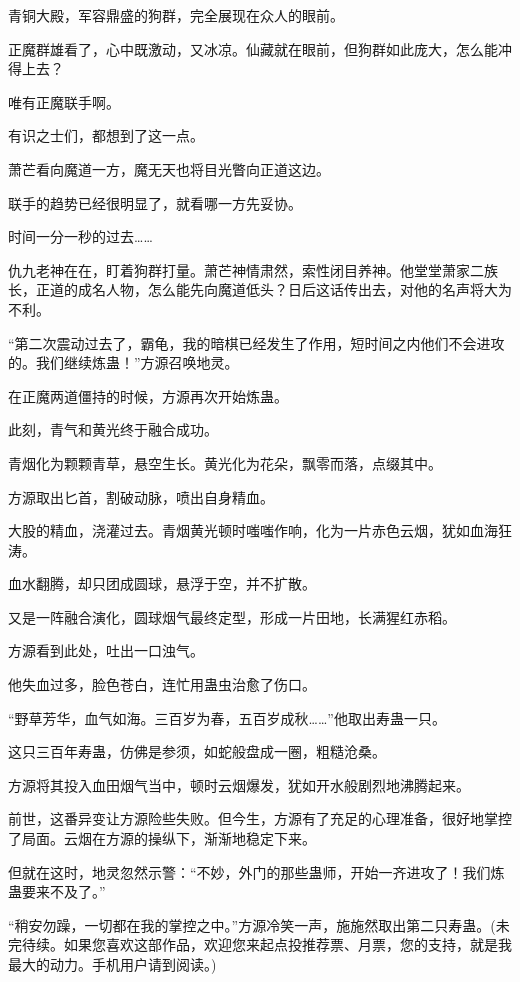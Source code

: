 \begin{this_body}
青铜大殿，军容鼎盛的狗群，完全展现在众人的眼前。

正魔群雄看了，心中既激动，又冰凉。仙藏就在眼前，但狗群如此庞大，怎么能冲得上去？

唯有正魔联手啊。

有识之士们，都想到了这一点。

萧芒看向魔道一方，魔无天也将目光瞥向正道这边。

联手的趋势已经很明显了，就看哪一方先妥协。

时间一分一秒的过去……

仇九老神在在，盯着狗群打量。萧芒神情肃然，索性闭目养神。他堂堂萧家二族长，正道的成名人物，怎么能先向魔道低头？日后这话传出去，对他的名声将大为不利。

“第二次震动过去了，霸龟，我的暗棋已经发生了作用，短时间之内他们不会进攻的。我们继续炼蛊！”方源召唤地灵。

在正魔两道僵持的时候，方源再次开始炼蛊。

此刻，青气和黄光终于融合成功。

青烟化为颗颗青草，悬空生长。黄光化为花朵，飘零而落，点缀其中。

方源取出匕首，割破动脉，喷出自身精血。

大股的精血，浇灌过去。青烟黄光顿时嗤嗤作响，化为一片赤色云烟，犹如血海狂涛。

血水翻腾，却只团成圆球，悬浮于空，并不扩散。

又是一阵融合演化，圆球烟气最终定型，形成一片田地，长满猩红赤稻。

方源看到此处，吐出一口浊气。

他失血过多，脸色苍白，连忙用蛊虫治愈了伤口。

“野草芳华，血气如海。三百岁为春，五百岁成秋……”他取出寿蛊一只。

这只三百年寿蛊，仿佛是参须，如蛇般盘成一圈，粗糙沧桑。

方源将其投入血田烟气当中，顿时云烟爆发，犹如开水般剧烈地沸腾起来。

前世，这番异变让方源险些失败。但今生，方源有了充足的心理准备，很好地掌控了局面。云烟在方源的操纵下，渐渐地稳定下来。

但就在这时，地灵忽然示警：“不妙，外门的那些蛊师，开始一齐进攻了！我们炼蛊要来不及了。”

“稍安勿躁，一切都在我的掌控之中。”方源冷笑一声，施施然取出第二只寿蛊。(未完待续。如果您喜欢这部作品，欢迎您来起点投推荐票、月票，您的支持，就是我最大的动力。手机用户请到阅读。)

\end{this_body}

